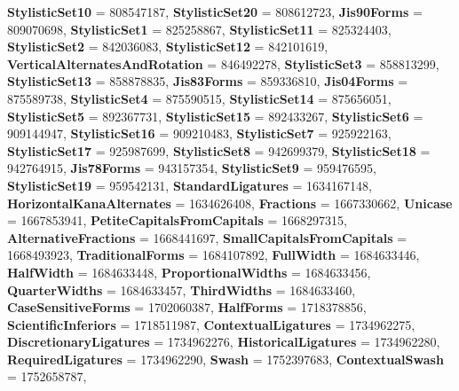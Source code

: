 \begin{DoxyCompactItemize}
{\bfseries Stylistic\+Set10} = 808547187, 
{\bfseries Stylistic\+Set20} = 808612723, 
{\bfseries Jis90\+Forms} = 809070698, 
\newline
{\bfseries Stylistic\+Set1} = 825258867, 
{\bfseries Stylistic\+Set11} = 825324403, 
{\bfseries Stylistic\+Set2} = 842036083, 
{\bfseries Stylistic\+Set12} = 842101619, 
\newline
{\bfseries Vertical\+Alternates\+And\+Rotation} = 846492278, 
{\bfseries Stylistic\+Set3} = 858813299, 
{\bfseries Stylistic\+Set13} = 858878835, 
{\bfseries Jis83\+Forms} = 859336810, 
\newline
{\bfseries Jis04\+Forms} = 875589738, 
{\bfseries Stylistic\+Set4} = 875590515, 
{\bfseries Stylistic\+Set14} = 875656051, 
{\bfseries Stylistic\+Set5} = 892367731, 
\newline
{\bfseries Stylistic\+Set15} = 892433267, 
{\bfseries Stylistic\+Set6} = 909144947, 
{\bfseries Stylistic\+Set16} = 909210483, 
{\bfseries Stylistic\+Set7} = 925922163, 
\newline
{\bfseries Stylistic\+Set17} = 925987699, 
{\bfseries Stylistic\+Set8} = 942699379, 
{\bfseries Stylistic\+Set18} = 942764915, 
{\bfseries Jis78\+Forms} = 943157354, 
\newline
{\bfseries Stylistic\+Set9} = 959476595, 
{\bfseries Stylistic\+Set19} = 959542131, 
{\bfseries Standard\+Ligatures} = 1634167148, 
{\bfseries Horizontal\+Kana\+Alternates} = 1634626408, 
\newline
{\bfseries Fractions} = 1667330662, 
{\bfseries Unicase} = 1667853941, 
{\bfseries Petite\+Capitals\+From\+Capitals} = 1668297315, 
{\bfseries Alternative\+Fractions} = 1668441697, 
\newline
{\bfseries Small\+Capitals\+From\+Capitals} = 1668493923, 
{\bfseries Traditional\+Forms} = 1684107892, 
{\bfseries Full\+Width} = 1684633446, 
{\bfseries Half\+Width} = 1684633448, 
\newline
{\bfseries Proportional\+Widths} = 1684633456, 
{\bfseries Quarter\+Widths} = 1684633457, 
{\bfseries Third\+Widths} = 1684633460, 
{\bfseries Case\+Sensitive\+Forms} = 1702060387, 
\newline
{\bfseries Half\+Forms} = 1718378856, 
{\bfseries Scientific\+Inferiors} = 1718511987, 
{\bfseries Contextual\+Ligatures} = 1734962275, 
{\bfseries Discretionary\+Ligatures} = 1734962276, 
\newline
{\bfseries Historical\+Ligatures} = 1734962280, 
{\bfseries Required\+Ligatures} = 1734962290, 
{\bfseries Swash} = 1752397683, 
{\bfseries Contextual\+Swash} = 1752658787, 

\end{DoxyCompactItemize}
